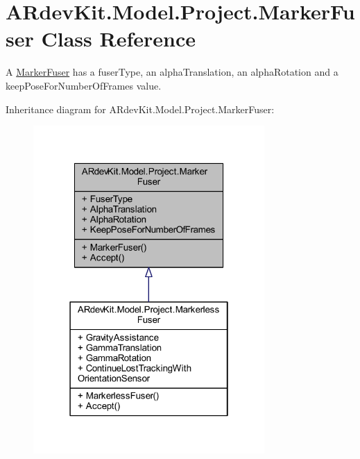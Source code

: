 \hypertarget{class_a_rdev_kit_1_1_model_1_1_project_1_1_marker_fuser}{\section{A\-Rdev\-Kit.\-Model.\-Project.\-Marker\-Fuser Class Reference}
\label{class_a_rdev_kit_1_1_model_1_1_project_1_1_marker_fuser}
}


A \hyperlink{class_a_rdev_kit_1_1_model_1_1_project_1_1_marker_fuser}{Marker\-Fuser} has a fuser\-Type, an alpha\-Translation, an alpha\-Rotation and a keep\-Pose\-For\-Number\-Of\-Frames value.  




Inheritance diagram for A\-Rdev\-Kit.\-Model.\-Project.\-Marker\-Fuser\-:
\nopagebreak
\begin{figure}[H]
\begin{center}
\leavevmode
\includegraphics[width=250pt]{class_a_rdev_kit_1_1_model_1_1_project_1_1_marker_fuser__inherit__graph}
\end{center}
\end{figure}


